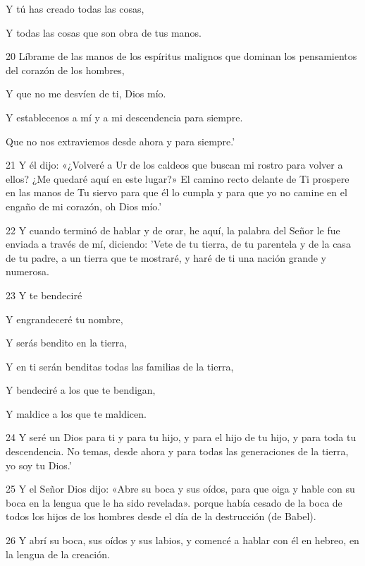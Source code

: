 \par     Y tú has creado todas las cosas,  
\par     Y todas las cosas que son obra de tus manos.
\par    
\par 20 Líbrame de las manos de los espíritus malignos que dominan los pensamientos del corazón de los hombres,  
\par     Y que no me desvíen de ti, Dios mío.
\par    
\par     Y establecenos a mí y a mi descendencia para siempre.  
\par     Que no nos extraviemos desde ahora y para siempre.'
\par    
\par 21 Y él dijo: «¿Volveré a Ur de los caldeos que buscan mi rostro para volver a ellos? ¿Me quedaré aquí en este lugar?» El camino recto delante de Ti prospere en las manos de Tu siervo para que él lo cumpla y para que yo no camine en el engaño de mi corazón, oh Dios mío.'
\par 22 Y cuando terminó de hablar y de orar, he aquí, la palabra del Señor le fue enviada a través de mí, diciendo: 'Vete de tu tierra, de tu parentela y de la casa de tu padre, a un tierra que te mostraré, y haré de ti una nación grande y numerosa.
\par    
\par 23 Y te bendeciré  
\par     Y engrandeceré tu nombre,  
\par     Y serás bendito en la tierra,  
\par     Y en ti serán benditas todas las familias de la tierra,  
\par     Y bendeciré a los que te bendigan,  
\par     Y maldice a los que te maldicen.
\par    
\par 24 Y seré un Dios para ti y para tu hijo, y para el hijo de tu hijo, y para toda tu descendencia. No temas, desde ahora y para todas las generaciones de la tierra, yo soy tu Dios.'
\par 25 Y el Señor Dios dijo: «Abre su boca y sus oídos, para que oiga y hable con su boca en la lengua que le ha sido revelada». porque había cesado de la boca de todos los hijos de los hombres desde el día de la destrucción (de Babel).
\par 26 Y abrí su boca, sus oídos y sus labios, y comencé a hablar con él en hebreo, en la lengua de la creación.

